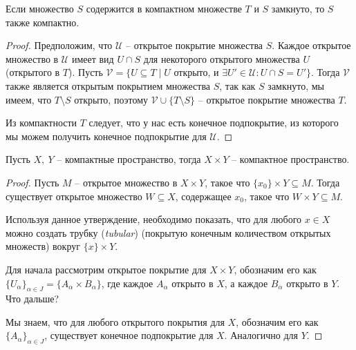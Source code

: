 \begin{statement}
	Если множество $S$ содержится в компактном множестве $T$ и $S$ замкнуто, то $S$ также компактно.
\end{statement}
\begin{proof}
	Предположим, что $\mathcal{U}$ -- открытое покрытие множества $S$. Каждое открытое множество в $\mathcal{U}$ имеет вид $U \cap S$ для некоторого открытого множества $U$ (открытого в $T$). Пусть $\mathcal{V} = \{ U \subseteq T \mid U$ открыто, и $\exists U' \in \mathcal{U} : U \cap S = U' \}$. Тогда $\mathcal{V}$ также является открытым покрытием множества $S$, так как $S$ замкнуто, мы имеем, что $T \setminus S$ открыто, поэтому $\mathcal{V} \cup \{ T \setminus S \}$ -- открытое покрытие множества $T$.

Из компактности $T$ следует, что у нас есть конечное подпокрытие, из которого мы можем получить конечное подпокрытие для $\mathcal{U}$.
\end{proof}


\begin{statement}
	Пусть \(X, \ Y\) -- компактные пространство, тогда \(X \times Y\) -- компактное пространство.
\end{statement}
\begin{proof}
	Пусть $M$ -- открытое множество в $X \times Y$, такое что $\{x_0\} \times Y \subseteq M$. Тогда существует открытое множество $W \subseteq X$, содержащее $x_0$, такое что $W \times Y \subseteq M$.

Используя данное утверждение, необходимо показать, что для любого $x \in X$ можно создать трубку (\textit{tubular}) (покрытую конечным количеством открытых множеств) вокруг $\{x\} \times Y$.

Для начала рассмотрим открытое покрытие для $X \times Y$, обозначим его как $\{U_{\alpha}\}_{\alpha \in J} = \{A_{\alpha} \times B_{\alpha}\}$, где каждое $A_{\alpha}$ открыто в $X$, а каждое $B_{\alpha}$ открыто в $Y$. Что дальше?

Мы знаем, что для любого открытого покрытия для $X$, обозначим его как $\{A_{\alpha}\}_{\alpha \in J}$, существует конечное подпокрытие для $X$. Аналогично для $Y$.
\end{proof}

